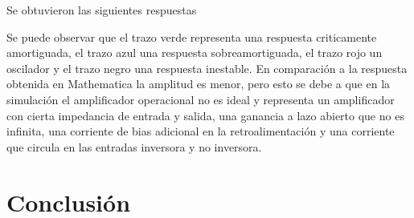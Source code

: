 \documentclass[10pt,a4paper]{article} %
\begin{document}
Se obtuvieron las siguientes respuestas

\begin{center}
\end{center}

Se puede observar que el trazo verde representa una respuesta criticamente amortiguada, el trazo azul una respuesta sobreamortiguada, el trazo rojo un oscilador y el trazo negro una respuesta inestable. En comparación a la respuesta obtenida en Mathematica la amplitud es menor, pero esto se debe a que en la simulación el amplificador operacional no es ideal y representa un amplificador con cierta impedancia de entrada y salida, una ganancia a lazo abierto que no es infinita, una corriente de bias adicional en la retroalimentación y una corriente que circula en las entradas inversora y no inversora.

\section{Conclusión}
\end{document}
